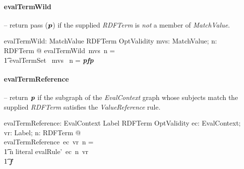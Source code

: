 \documentclass[fuzz]{llncs}
\def\pass{\textbf{\textit{p}}}
\def\fail{\textbf{\textit{f}}}
\def\zc{\textit}
\begin{document}
\paragraph{evalTermWild} -- return pass ($\pass$) if the supplied \zc{RDFTerm} is \textit{not} a member of \zc{MatchValue}.

\begin{axdef}
   evalTermWild: \power MatchValue \fun RDFTerm \fun OptValidity
\where
   \forall mvs: \power MatchValue; n: RDFTerm @ evalTermWild~mvs~n = \\
\t1 \IF evalTermSet~ mvs~ n = \pass \THEN \fail \ELSE \pass
\end{axdef}

\paragraph{evalTermReference} -- return $\pass$ if the subgraph of the \zc{EvalContext} graph whose subjects match the supplied \zc{RDFTerm} satisfies the \zc{ValueReference} rule.

\begin{axdef}
   evalTermReference: EvalContext \pfun Label \pfun RDFTerm \pfun OptValidity
\where
	\forall ec: EvalContext; vr: Label; n: RDFTerm @ \\ evalTermReference~ec~vr~n = \\
\t1 \IF n \notin \ran literal \THEN evalRule'~ec~n~vr \\
\t1 \ELSE \fail
\end{axdef}
\end{document}
